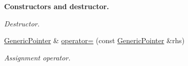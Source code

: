 \begin{Indent}{\bf Constructors and destructor.}
\begin{DoxyCompactItemize}
\begin{DoxyCompactList}\small\item\em Destructor. \end{DoxyCompactList}\item 
\hyperlink{class_generic_pointer}{Generic\+Pointer} \& \hyperlink{class_generic_pointer_a1d0174a6e72daa4024da9e08ce1e7951}{operator=} (const \hyperlink{class_generic_pointer}{Generic\+Pointer} \&rhs)\hypertarget{class_generic_pointer_a1d0174a6e72daa4024da9e08ce1e7951}{}\label{class_generic_pointer_a1d0174a6e72daa4024da9e08ce1e7951}

\begin{DoxyCompactList}\small\item\em Assignment operator. \end{DoxyCompactList}\end{DoxyCompactItemize}
\end{Indent}
